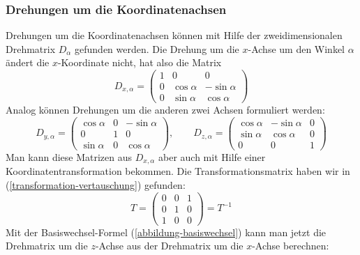 \subsubsection{Drehungen um die Koordinatenachsen}
Drehungen um die Koordinatenachsen können mit Hilfe der zweidimensionalen
Drehmatrix $D_\alpha$ gefunden werden.
Die Drehung um die $x$-Achse um den
Winkel $\alpha$ ändert die $x$-Koordinate nicht, hat also die
Matrix
\[
D_{x,\alpha}=
\begin{pmatrix}
1&0&0\\
0&\cos\alpha&-\sin\alpha\\
0&\sin\alpha&\cos\alpha
\end{pmatrix}
\]
Analog können Drehungen um die anderen zwei Achsen formuliert werden:
\[
D_{y,\alpha}=\begin{pmatrix}
\cos\alpha&0&-\sin\alpha\\
0&1&0\\
\sin\alpha&0&\cos\alpha
\end{pmatrix}
,\qquad
D_{z,\alpha}=\begin{pmatrix}
\cos\alpha&-\sin\alpha&0\\
\sin\alpha&\cos\alpha&0\\
0&0&1
\end{pmatrix}
\]
Man kann diese Matrizen aus $D_{x,\alpha}$ aber auch mit Hilfe einer
Koordinatentransformation bekommen.
Die Transformationsmatrix
haben wir in (\ref{transformation-vertauschung}) gefunden:
\[
T=
\begin{pmatrix}
0&0&1\\
0&1&0\\
1&0&0
\end{pmatrix}
=T^{-1}
\]
Mit der Basiswechsel-Formel (\ref{abbildung-basiswechsel}) kann
man jetzt die Drehmatrix um die $z$-Achse aus der Drehmatrix um die
$x$-Achse berechnen:
